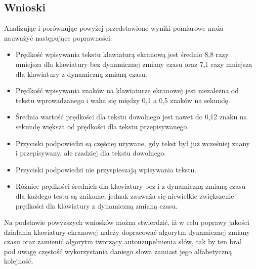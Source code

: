 \documentclass[twoside,a4paper]{book}
\begin{document}
\subsection{Wnioski}
Analizując i porównując powyżej przedstawione wyniki pomiarowe moża nauważyć następujące poprawności:
\begin{itemize}
\item Prędkość wpisywania tekstu klawiaturą ekranową jest średnio 8,8 razy mniejsza dla klawiatury bez dynamicznej zmiany czasu oraz 7,1 razy mniejsza dla klawiatury z dynamiczną zmianą czasu. 
\item Prędkość wpisywania znaków na klawiaturze ekranowej jest niezależna od tekstu wprowadzanego i waha się między 0,1 a 0,5 znaków na sekundę. 
\item Średnia wartość prędkości dla tekstu dowolnego jest nawet do 0,12 znaku na sekundę większa od prędkości dla tekstu przepisywanego.
\item Przyciski podpowiedzi są częściej używane, gdy tekst był już wcześniej znany i przepisywany, ale rzadziej dla tekstu dowolnego.
\item Przyciski podpowiedzi nie przyspieszają wpisywania tekstu.
\item Różnice prędkości średnich dla klawiatury bez i z dynamiczną zmianą czasu dla każdego testu są znikome, jednak zauważa się niewielkie zwiększenie prędkości dla klawiatury z dynamiczną zmianą czasu. 
\end{itemize}
Na podstawie powyższych wniosków można stwierdzić, iż w celu poprawy jakości działania klawiatury ekranowej należy dopracować algorytm dynamicznej zmiany czasu oraz zamienić algorytm tworzący autouzupełnienia słów, tak by ten brał pod uwagę częstość wykorzystania daniego słowa zamiast jego alfabetyczną kolejność.
\end{document}

